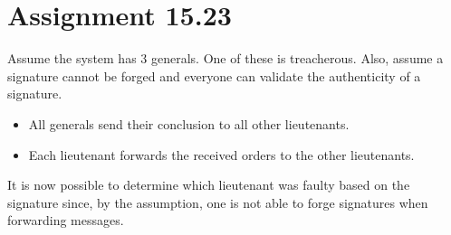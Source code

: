 \section{Assignment 15.23}
Assume the system has 3 generals. One of these is treacherous. Also, assume a signature cannot be forged and everyone can validate the authenticity of a signature.

\begin{itemize}
	\item All generals send their conclusion to all other lieutenants. 
	\item Each lieutenant forwards the received orders to the other lieutenants.
\end{itemize}

It is now possible to determine which lieutenant was faulty based on the signature since, by the assumption, one is not able to forge signatures when forwarding messages.